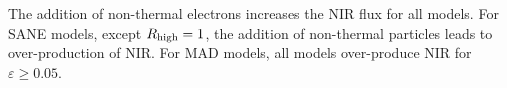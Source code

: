




The addition of non-thermal electrons increases the NIR flux for all models. For SANE models, except $R_\mathrm{high}=1$, the addition of non-thermal particles leads to over-production of NIR. For MAD models, all models over-produce NIR for $\varepsilon \ge 0.05$.


